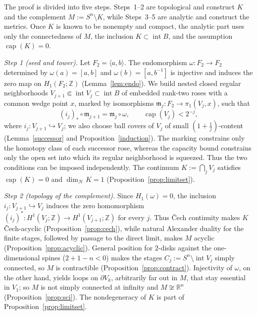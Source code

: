 \documentclass[12pt,oneside,a4paper]{article}
\theoremstyle{mytheorem}
\theoremstyle{remark}
\theoremstyle{definition}
\begin{document}
The proof is divided into five steps. Steps~1--2 are topological and
construct $K$ and the complement $M:=S^n\setminus K$, while
Steps~3--5 are analytic and construct the metrics.  Once $K$ is known
to be nonempty and compact, the analytic part uses only the
connectedness of $M$, the inclusion $K\subset\operatorname{int}B$, and
the assumption $\operatorname{cap}(K)=0$.

\noindent\emph{Step 1 (seed and tower).}
Let \(F_2=\langle a,b\rangle\).  The endomorphism
\(\omega:F_2\to F_2\) determined by
\(\omega(a)=[a,b]\) and \(\omega(b)=[a,b^{-1}]\) is
injective and induces the zero map on \(H_1(F_2;\mathbb Z)\)
(Lemma~\ref{lem:endo}).  We build nested
closed regular neighborhoods
\(V_{j+1}\Subset\operatorname{int}V_j\subset\operatorname{int}B\) of embedded rank-two
roses with a common wedge point \(x\), marked by isomorphisms
\(\mathfrak{m}_j:F_2\to\pi_1(V_j,x)\), such that
\[
(i_j)_*\circ\mathfrak{m}_{j+1}=\mathfrak{m}_j\circ\omega,
\qquad
\operatorname{cap}(V_j)<2^{-j},
\]
where \(i_j:V_{j+1}\hookrightarrow V_j\); we also choose ball covers of
\(V_j\) of small \((1+\frac1j)\)-content
(Lemma~\ref{successor} and Proposition~\ref{induction}).  The marking
constrains only the homotopy class of each successor rose, whereas the
capacity bound constrains only the open set into which its regular
neighborhood is squeezed.  Thus the two conditions can be imposed
independently.  The continuum
\(K:=\bigcap_jV_j\) satisfies \(\operatorname{cap}(K)=0\) and
\(\dim_{\mathcal{H}}K=1\) (Proposition~\ref{prop:limitset}).

\noindent\emph{Step 2 (topology of the complement).}
Since \(H_1(\omega)=0\), the inclusion
\(i_j:V_{j+1}\hookrightarrow V_j\) induces the zero homomorphism
\((i_j)^*:H^1(V_j;\mathbb Z)\to  H^1(V_{j+1};\mathbb Z)\)
for every \(j\).  Thus \v{C}ech
continuity makes \(K\) \v{C}ech-acyclic
(Proposition~\ref{prop:cech}), while natural Alexander duality for the
finite stages, followed by passage to the direct limit, makes \(M\)
acyclic (Proposition~\ref{prop:acyclic}).
General position for \(2\)-disks against the one-dimensional spines
(\(2+1-n<0\)) makes the stages
\(C_j:= S^n\setminus\operatorname{int}V_j\) simply connected, so
\(M\) is contractible (Proposition~\ref{prop:contract}).  Injectivity of
\(\omega\), on the other hand, yields loops on \(\partial V_k\),
arbitrarily far out in \(M\), that stay essential in \(V_1\); so \(M\) is
not simply connected at infinity and \(M\not\cong\mathbb R^n\)
(Proposition~\ref{prop:sci}).  The nondegeneracy of \(K\) is part of
Proposition~\ref{prop:limitset}.
\end{document}
